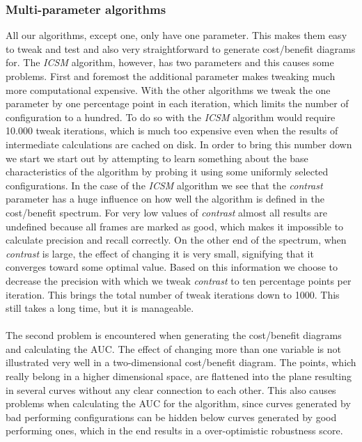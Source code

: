 \subsubsection{Multi-parameter algorithms} \label{sec:ph1multiparameter}
%
All our algorithms, except one, only have one parameter. This makes them easy to tweak and test and also very straightforward to generate cost/benefit diagrams for. The \textit{ICSM} algorithm, however, has two parameters and this causes some problems. First and foremost the additional parameter makes tweaking much more computational expensive. With the other algorithms we tweak the one parameter by one percentage point in each iteration, which limits the number of configuration to a hundred. To do so with the \textit{ICSM} algorithm would require 10.000 tweak iterations, which is much too expensive even when the results of intermediate calculations are cached on disk. In order to bring this number down we start we start out by attempting to learn something about the base characteristics of the algorithm by probing it using some uniformly selected configurations. In the case of the \textit{ICSM} algorithm we see that the \textit{contrast} parameter has a huge influence on how well the algorithm is defined in the cost/benefit spectrum. For very low values of \textit{contrast} almost all results are undefined because all frames are marked as good, which makes it impossible to calculate precision and recall correctly. On the other end of the spectrum, when \textit{contrast} is large, the effect of changing it is very small, signifying that it converges toward some optimal value. Based on this information we choose to decrease the precision with which we tweak \textit{contrast} to ten percentage points per iteration. This brings the total number of tweak iterations down to 1000. This still takes a long time, but it is manageable.\\
\\
The second problem is encountered when generating the cost/benefit diagrams and calculating the AUC. The effect of changing more than one variable is not illustrated very well in a two-dimensional cost/benefit diagram. The points, which really belong in a higher dimensional space, are flattened into the plane resulting in several curves without any clear connection to each other. This also causes problems when calculating the AUC for the algorithm, since curves generated by bad performing configurations can be hidden below curves generated by good performing ones, which in the end results in a over-optimistic robustness score.
